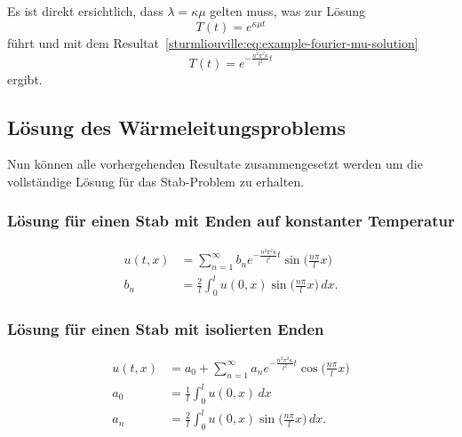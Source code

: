 Es ist direkt ersichtlich, dass $\lambda = \kappa \mu$ gelten muss, was zur
Lösung
\[
    T(t)
    =
    e^{\kappa \mu t}
\]
führt und mit dem Resultat~\eqref{sturmliouville:eq:example-fourier-mu-solution}
\[
    T(t)
    =
    e^{-\frac{n^{2}\pi^{2}\kappa}{l^{2}}t}
\]
ergibt.

\subsection{Lösung des Wärmeleitungsproblems}

Nun können alle vorhergehenden Resultate zusammengesetzt
werden um die vollständige Lösung für das Stab-Problem zu erhalten.

\subsubsection{Lösung für einen Stab mit Enden auf konstanter Temperatur}
\[
\begin{aligned}
    u(t,x)
    &=
    \sum_{n=1}^{\infty}b_{n}e^{-\frac{n^{2}\pi^{2}\kappa}{l^{2}}t}
    \sin\biggl(\frac{n\pi}{l}x\biggr)
    \\
    b_{n}
    &=
    \frac{2}{l}\int_{0}^{l}u(0,x)\sin\biggl(\frac{n\pi}{l}x\biggr) \,dx.
\end{aligned}
\]

\subsubsection{Lösung für einen Stab mit isolierten Enden}
\[
\begin{aligned}
    u(t,x)
    &=
    a_{0} + \sum_{n=1}^{\infty}a_{n}e^{-\frac{n^{2}\pi^{2}\kappa}{l^{2}}t}
    \cos\biggl(\frac{n\pi}{l}x\biggr)
    \\
    a_{0}
    &=
    \frac{1}{l}\int_{0}^{l}u(0,x) \,dx
    \\
    a_{n}
    &=
    \frac{2}{l}\int_{0}^{l}u(0,x)\sin\biggl(\frac{n\pi}{l}x\biggr) \,dx.
\end{aligned}
\]
